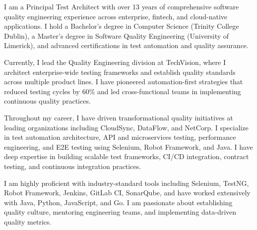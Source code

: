 \par{
I am a Principal Test Architect with over 13 years of comprehensive software quality engineering experience across enterprise, fintech, and cloud-native applications. I hold a Bachelor's degree in Computer Science (Trinity College Dublin), a Master's degree in Software Quality Engineering (University of Limerick), and advanced certifications in test automation and quality assurance.

Currently, I lead the Quality Engineering division at TechVision, where I architect enterprise-wide testing frameworks and establish quality standards across multiple product lines. I have pioneered automation-first strategies that reduced testing cycles by 60\% and led cross-functional teams in implementing continuous quality practices.

Throughout my career, I have driven transformational quality initiatives at leading organizations including CloudSync, DataFlow, and NetCorp. I specialize in test automation architecture, API and microservices testing, performance engineering, and E2E testing using Selenium, Robot Framework, and Java. I have deep expertise in building scalable test frameworks, CI/CD integration, contract testing, and continuous integration practices.

I am highly proficient with industry-standard tools including Selenium, TestNG, Robot Framework, Jenkins, GitLab CI, SonarQube, and have worked extensively with Java, Python, JavaScript, and Go. I am passionate about establishing quality culture, mentoring engineering teams, and implementing data-driven quality metrics.
}
\vspace{1em}